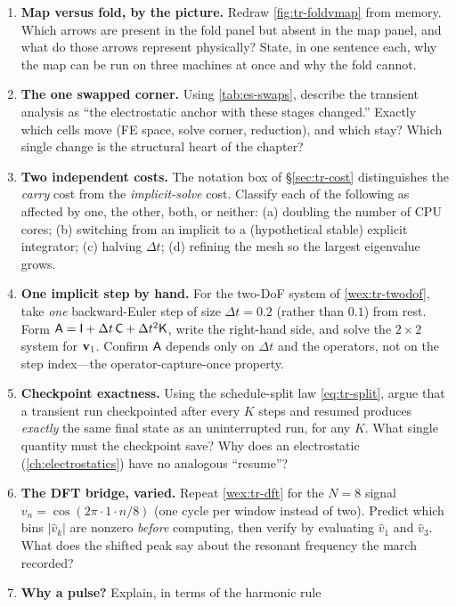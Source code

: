 \exercisessection
\begin{enumerate}[nosep]
  \item \textbf{Map versus fold, by the picture.} Redraw \cref{fig:tr-foldvmap} from
  memory. Which arrows are present in the fold panel but absent in the map panel, and
  what do those arrows represent physically? State, in one sentence each, why the map
  can be run on three machines at once and why the fold cannot.
  \item \textbf{The one swapped corner.} Using \cref{tab:es-swaps}, describe the
  transient analysis as ``the electrostatic anchor with these stages changed.''
  Exactly which cells move (FE space, solve corner, reduction), and which stay? Which
  single change is the structural heart of the chapter?
  \item \textbf{Two independent costs.} The notation box of \S\ref{sec:tr-cost}
  distinguishes the \emph{carry} cost from the \emph{implicit-solve} cost. Classify
  each of the following as affected by one, the other, both, or neither: (a) doubling
  the number of CPU cores; (b) switching from an implicit to a (hypothetical stable)
  explicit integrator; (c) halving $\Delta t$; (d) refining the mesh so the largest
  eigenvalue grows.
  \item \textbf{One implicit step by hand.} For the two-DoF system of
  \cref{wex:tr-twodof}, take \emph{one} backward-Euler step of size $\Delta t=0.2$
  (rather than $0.1$) from rest. Form $\mathsf{A}=\mathsf{I}+\Delta t\,\mathsf{C}+\Delta t^2\mathsf{K}$,
  write the right-hand side, and solve the $2\times2$ system for $\mathbf{v}_1$. Confirm
  $\mathsf{A}$ depends only on $\Delta t$ and the operators, not on the step index---the
  operator-capture-once property.
  \item \textbf{Checkpoint exactness.} Using the schedule-split law \cref{eq:tr-split},
  argue that a transient run checkpointed after every $K$ steps and resumed produces
  \emph{exactly} the same final state as an uninterrupted run, for any $K$. What
  single quantity must the checkpoint save? Why does an electrostatic
   (\cref{ch:electrostatics}) have no analogous ``resume''?
  \item \textbf{The DFT bridge, varied.} Repeat \cref{wex:tr-dft} for the $N=8$ signal
  $v_n=\cos(2\pi\cdot1\cdot n/8)$ (one cycle per window instead of two). Predict which
  bins $|\hat v_k|$ are nonzero \emph{before} computing, then verify by evaluating
  $\hat v_1$ and $\hat v_3$. What does the shifted peak say about the resonant
  frequency the march recorded?
  \item \textbf{Why a pulse?} Explain, in terms of the harmonic rule

\end{enumerate}

